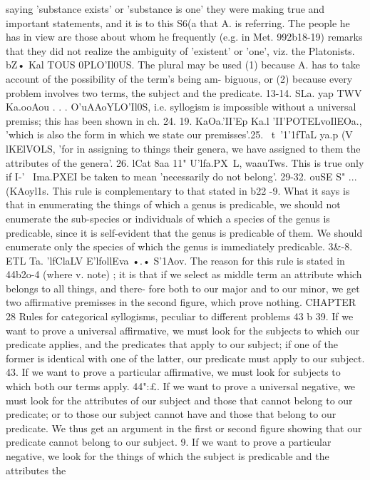 {{{{{{{{{{{{{{{{{{{saying 'substance exists' or 'substance is one' they were making
true and important statements, and it is to this S6(a that A. is
referring. The people he has in view are those about whom he
frequently (e.g. in Met. 992b18-19) remarks that they did not
realize the ambiguity of 'existent' or 'one', viz. the Platonists.
bZ• Kal TOUS 0PLO'Il0US. The plural may be used (1) because A.
has to take account of the possibility of the term's being am-
biguous, or (2) because every problem involves two terms, the
subject and the predicate.
13-14. SLa. yap TWV Ka.ooAou . . . O'uAAoYLO'Il0S, i.e. syllogism
is impossible without a universal premiss; this has been shown
in ch. 24.
19. KaOa.'II'Ep Ka.l 'II'POTELvoIlEOa., 'which is also the form in which
we state our premisses'.25. ~t~'1'1fTaL ya.p (V lKElVOLS, 'for in assigning to things their
genera, we have assigned to them the attributes of the genera'.
26. lCat 8aa 11" U'lfa.PX~L, waauTws. This is true only if I-'~
Ima.PXEI be taken to mean 'necessarily do not belong'.
29-32. ouSE S" ... (KAoyl1s. This rule is complementary to
that stated in b22 -9. What it says is that in enumerating the
things of which a genus is predicable, we should not enumerate
the sub-species or individuals of which a species of the genus is
predicable, since it is self-evident that the genus is predicable of
them. We should enumerate only the species of which the genus
is immediately predicable.
3&-8. ETL Ta. 'lfClaLV E'lfollEva •.• S'1Aov. The reason for this
rule is stated in 44b2o-4 (where v. note) ; it is that if we select as
middle term an attribute which belongs to all things, and there-
fore both to our major and to our minor, we get two affirmative
premisses in the second figure, which prove nothing.
CHAPTER 28
Rules for categorical syllogisms, peculiar to different problems
43 b 39. If we want to prove a universal affirmative, we must
look for the subjects to which our predicate applies, and the
predicates that apply to our subject; if one of the former is
identical with one of the latter, our predicate must apply to our
subject.
43. If we want to prove a particular affirmative, we must look
for subjects to which both our terms apply.
44":£. If we want to prove a universal negative, we must look
for the attributes of our subject and those that cannot belong to
our predicate; or to those our subject cannot have and those that
belong to our predicate. We thus get an argument in the first or
second figure showing that our predicate cannot belong to our
subject.
9. If we want to prove a particular negative, we look for the
things of which the subject is predicable and the attributes the
}}}}}}}}}}}}}}}}}}}
